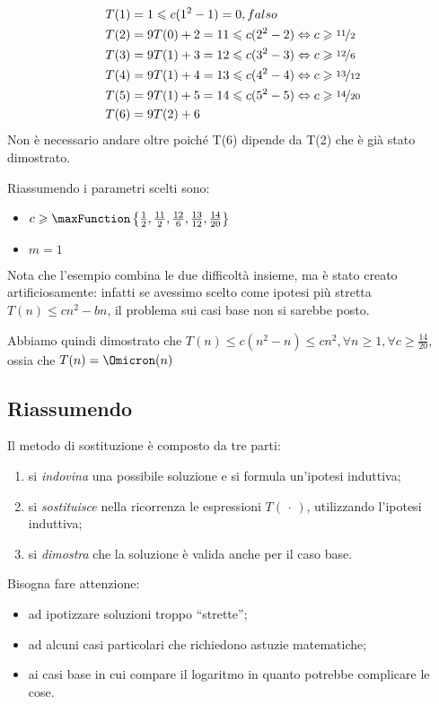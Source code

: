 \begin{itemize}
\begin{align*}
		T(1) &= 1 \leqslant c(1^2 - 1) = 0, falso\\
		T(2) &= 9T(0) + 2 = 11 \leqslant c(2^2 - 2) \Leftrightarrow c \geqslant \nicefrac{11}{2}\\
		T(3) &= 9T(1) + 3 = 12 \leqslant c(3^2 - 3) \Leftrightarrow c \geqslant \nicefrac{12}{6}\\
		T(4) &= 9T(1) + 4 = 13 \leqslant c(4^2 - 4) \Leftrightarrow c \geqslant \nicefrac{13}{12}\\
		T(5) &= 9T(1) + 5 = 14 \leqslant c(5^2 - 5) \Leftrightarrow c \geqslant \nicefrac{14}{20}\\
		T(6) &= 9T(2) + 6
	\end{align*}
	Non è necessario andare oltre poiché T(6) dipende da T(2) che è già stato dimostrato.

	Riassumendo i parametri scelti sono:
	\begin{itemize}[label=\textbullet]
		\item \(c \geqslant \maxFunction \left\{ \frac{1}{2},\frac{11}{2},\frac{12}{6},\frac{13}{12},\frac{14}{20} \right\}\)
		\item \(m = 1\)
	\end{itemize}
	Nota che l'esempio combina le due difficoltà insieme, ma è stato creato artificiosamente: infatti se avessimo scelto come ipotesi più stretta \(T(n) \leqslant cn^2 - bn\), il problema sui casi base non si sarebbe posto.

	Abbiamo quindi dimostrato che \(T(n) \leqslant c(n^2 - n) \leqslant cn^2, \forall n \geqslant 1, \forall c \geqslant \frac{14}{20}\), ossia che \(T(n) = \Omicron(n)\)
\end{itemize}

\subsection*{Riassumendo}

Il metodo di sostituzione è composto da tre parti:
\begin{enumerate}
	\item si \emph{indovina} una possibile soluzione e si formula un'ipotesi induttiva;
	\item si \emph{sostituisce} nella ricorrenza le espressioni \(T(\,\cdot\,)\), utilizzando l'ipotesi induttiva;
	\item si \emph{dimostra} che la soluzione è valida anche per il caso base.
\end{enumerate}

Bisogna fare attenzione:
\begin{itemize}
	\item ad ipotizzare soluzioni troppo \enquote{strette};
	\item ad alcuni casi particolari che richiedono astuzie matematiche;
	\item ai casi base in cui compare il logaritmo in quanto potrebbe complicare le cose.
\end{itemize}

